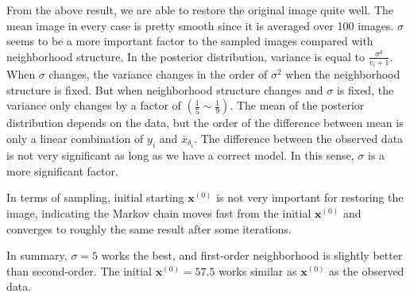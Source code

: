 From the above result, we are able to restore the original image quite well. The mean image in every case is pretty smooth since it is averaged over 100 images.
$\sigma$ seems to be a more important factor to the sampled images compared with neighborhood structure.
In the posterior distribution, variance is equal to $\frac{\sigma^2}{v_i+1}$.
When $\sigma$ changes, the variance changes in the order of $\sigma^2$ when the neighborhood structure is fixed. 
But when neighborhood structure changes and $\sigma$ is fixed, the variance only changes by a factor of $(\frac{1}{5}\sim\frac{1}{9})$.
The mean of the posterior distribution depends on the data, but the order of the difference between mean is only a linear combination of $y_i$ and $\bar{x}_{\delta_i}$. The difference between the observed data is not very significant as long as we have a correct model. 
In this sense, $\sigma$ is a more significant factor.

In terms of sampling, initial starting $\mathbf{x}^{(0)}$ is not very important for restoring the image, indicating the Markov chain moves fast from the initial $\mathbf{x}^{(0)}$ and converges to roughly the same result after some iterations. 

In summary, $\sigma=5$ works the best, and first-order neighborhood is slightly better than second-order. 
The initial $\mathbf{x}^{(0)}=57.5$ works similar as $\mathbf{x}^{(0)}$ as the observed data.